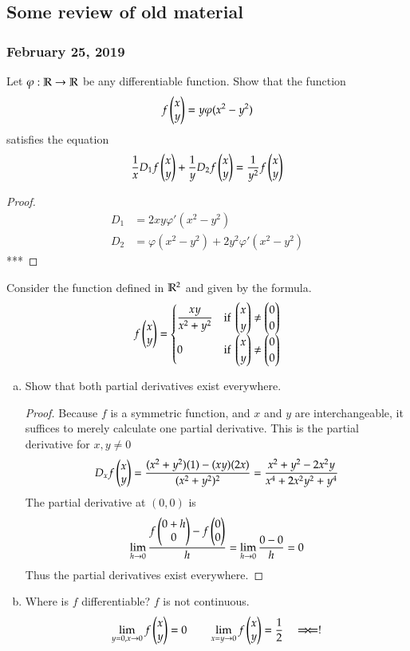 \subsection*{Some review of old material}
\subsubsection*{February 25, 2019}

 Let $\varphi : \mathbb{R} \to \mathbb{R}$ be any differentiable function. Show that the function
\[f\begin{pmatrix} x \\ y \end{pmatrix} = y\varphi (x^2-y^2)\]
satisfies the equation
\[\frac{1}{x}D_1f\begin{pmatrix} x \\ y \end{pmatrix}+\frac{1}{y}D_2f\begin{pmatrix} x \\ y \end{pmatrix}=\frac{1}{y^2}f\begin{pmatrix} x \\ y \end{pmatrix}\]

\begin{proof}
  \begin{align*}
  D_1 &= 2xy\varphi'(x^2-y^2) \\
  D_2 &= \varphi(x^2-y^2) + 2y^2 \varphi'(x^2-y^2)
\end{align*}
***
 \end{proof}

 Consider the function defined in $\mathbb{R}^2$ and given by the formula.
\[f\begin{pmatrix} x \\ y \end{pmatrix} = \begin{cases}
\displaystyle \frac{xy}{x^2+y^2} &\text{if } \begin{pmatrix} x \\ y \end{pmatrix}\neq \begin{pmatrix} 0 \\ 0 \end{pmatrix} \\
0 &\text{if } \begin{pmatrix} x \\ y \end{pmatrix}\neq \begin{pmatrix} 0 \\ 0 \end{pmatrix}
\end{cases}\]
\begin{enumerate}[a.]
  \item Show that both partial derivatives exist everywhere.

  \begin{proof}
    Because $f$ is a symmetric function, and $x$ and $y$ are interchangeable, it suffices to merely calculate one partial derivative. This is the partial derivative for $x,y\neq 0$
    \[D_xf\begin{pmatrix} x \\ y \end{pmatrix} = \frac{(x^2+y^2)(1)-(xy)(2x)}{(x^2+y^2)^2} = \frac{x^2+y^2-2x^2y}{x^4+2x^2y^2+y^4}\]
    The partial derivative at $(0,0)$ is
    \[\lim_{h\to 0} \frac{f\begin{pmatrix} 0 + h \\ 0 \end{pmatrix} - f\begin{pmatrix} 0 \\ 0 \end{pmatrix}}{h} = \lim_{h\to 0} \frac{0 - 0}{h} = 0\]
    Thus the partial derivatives exist everywhere.
  \end{proof}

  \item Where is $f$ differentiable?
  $f$ is not continuous.
  \[\lim_{y=0, x\to 0} f\begin{pmatrix} x \\ y \end{pmatrix} = 0 \qquad \lim_{x=y \to 0}f\begin{pmatrix} x \\ y \end{pmatrix} = \frac{1}{2} \quad \Rightarrow\!\Leftarrow !\]
\end{enumerate}

